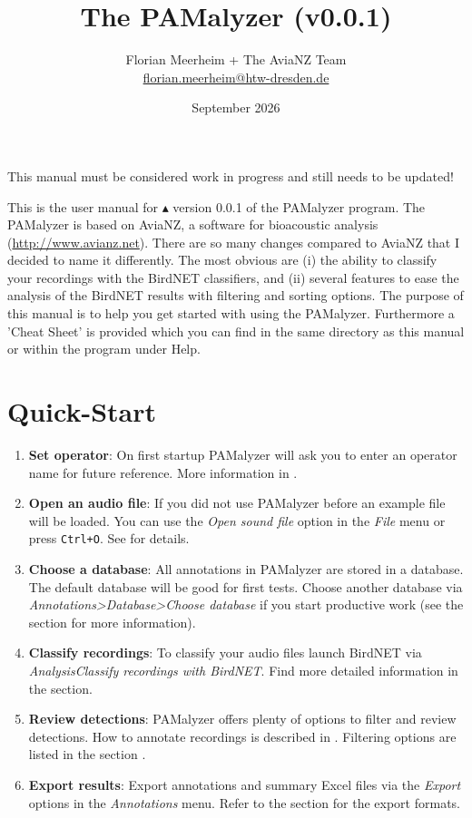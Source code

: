 \documentclass{scrartcl}
\title{The PAMalyzer (v0.0.1)}
\author{Florian Meerheim + The AviaNZ Team \\ \url{florian.meerheim@htw-dresden.de}}
\date{September 2026}
\begin{document}
\maketitle

This manual must be considered work in progress and still needs to be updated!

This is the user manual for $\blacktriangle$ version 0.0.1 of the PAMalyzer program.
The PAMalyzer is based on AviaNZ, a software for bioacoustic analysis (\url{http://www.avianz.net}).
There are so many changes compared to AviaNZ that I decided to name it differently.
The most obvious are (i) the ability to classify your recordings with the BirdNET classifiers, and (ii) several features to ease the analysis of the BirdNET results with filtering and sorting options.
The purpose of this manual is to help you get started with using the PAMalyzer.
Furthermore a 'Cheat Sheet' is provided which you can find in the same directory as this manual or within the program under Help. 


\section*{Quick-Start}\label{sec:QuickStart}

\begin{enumerate}
	\item \textbf{Set operator}: On first startup PAMalyzer will ask you to enter an operator name for future reference. More information in .
	\item \textbf{Open an audio file}: If you did not use PAMalyzer before an example file will be loaded. You can use the \textit{Open sound file} option in the \textit{File} menu or press \texttt{Ctrl+O}. See  for details.
	\item \textbf{Choose a database}: All annotations in PAMalyzer are stored in a database. The default database will be good for first tests. Choose another database via \textit{Annotations>Database>Choose database} if you start productive work (see the  section for more information).
	\item \textbf{Classify recordings}: To classify your audio files launch BirdNET via \textit{Analysis\textrightarrow Classify recordings with BirdNET}. Find more detailed information in the  section.
	\item \textbf{Review detections}: PAMalyzer offers plenty of options to filter and review detections. How to annotate recordings is described in . Filtering options are listed in the section .
	\item \textbf{Export results}: Export annotations and summary Excel files via the \textit{Export} options in the \textit{Annotations} menu.  Refer to the  section for the export formats.
\end{enumerate}
\end{document}
